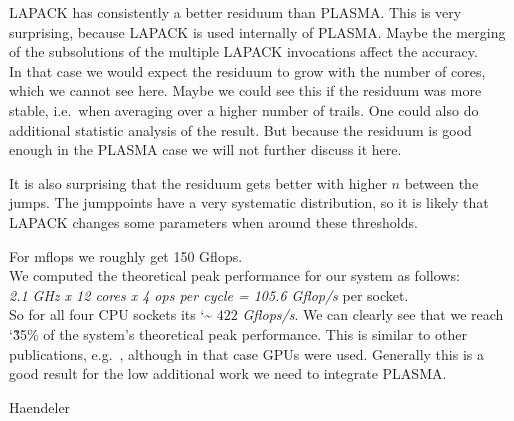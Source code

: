 \documentclass[a4paper,final,ngerman,english]{article}
\begin{document}
LAPACK has consistently a better residuum than PLASMA.\@
This is very surprising, because LAPACK is used internally of PLASMA.\@
Maybe the merging of the subsolutions of the multiple LAPACK invocations affect the accuracy.\\
In that case we would expect the residuum to grow with the number of cores, which we cannot see here.
Maybe we could see this if the residuum was more stable, i.e.\ when averaging over a higher number of trails.
One could also do additional statistic analysis of the result.
But because the residuum is good enough in the PLASMA case we will not further discuss it here.

It is also surprising that the residuum gets better with higher $n$ between the jumps.
The jumppoints have a very systematic distribution, so it is likely that
LAPACK changes some parameters when around these thresholds.

For mflops we roughly get 150 Gflops.\\
We computed the theoretical peak performance for our system as follows:\\
\textit{2.1 GHz x 12 cores x 4 ops per cycle = 105.6 Gflop/s} per socket.~\cite{lawn266} \\
So for all four CPU sockets its \char`\~ $422$ \textit{Gflops/s}.
We can clearly see that we reach \char`\~ 35\% of the system's theoretical peak performance.
This is similar to other publications, e.g.~\cite{lawn266},
although in that case GPUs were used.
Generally this is a good result for the low additional work we need to integrate PLASMA.
\begin{flushright} Haendeler \end{flushright} 
%
\ \\
\ \\
\ \\
\begin{footnotesize}
\end{footnotesize}
\end{document}
